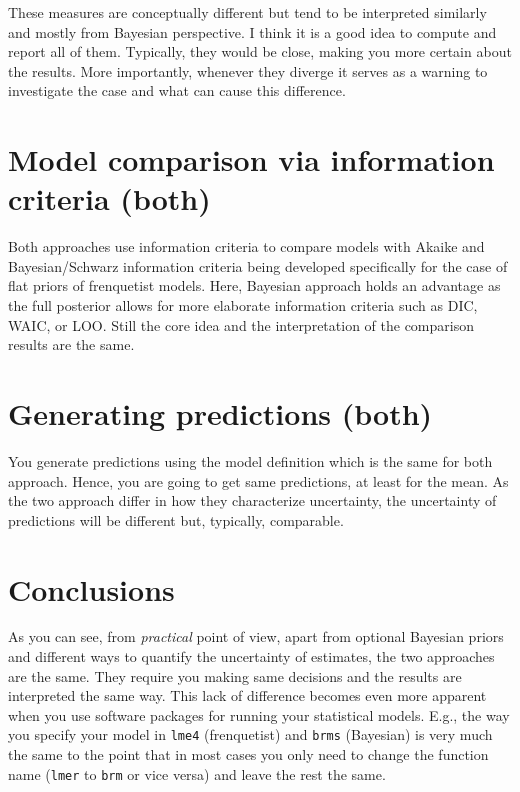\documentclass[
]{book}
\begin{document}
These measures are conceptually different but tend to be interpreted similarly and mostly from Bayesian perspective. I think it is a good idea to compute and report all of them. Typically, they would be close, making you more certain about the results. More importantly, whenever they diverge it serves as a warning to investigate the case and what can cause this difference.

\hypertarget{model-comparison-via-information-criteria-both}{%
\section{Model comparison via information criteria (both)}\label{model-comparison-via-information-criteria-both}}

Both approaches use information criteria to compare models with Akaike and Bayesian/Schwarz information criteria being developed specifically for the case of flat priors of frenquetist models. Here, Bayesian approach holds an advantage as the full posterior allows for more elaborate information criteria such as DIC, WAIC, or LOO. Still the core idea and the interpretation of the comparison results are the same.

\hypertarget{generating-predictions-both}{%
\section{Generating predictions (both)}\label{generating-predictions-both}}

You generate predictions using the model definition which is the same for both approach. Hence, you are going to get same predictions, at least for the mean. As the two approach differ in how they characterize uncertainty, the uncertainty of predictions will be different but, typically, comparable.

\hypertarget{conclusions}{%
\section{Conclusions}\label{conclusions}}

As you can see, from \emph{practical} point of view, apart from optional Bayesian priors and different ways to quantify the uncertainty of estimates, the two approaches are the same. They require you making same decisions and the results are interpreted the same way. This lack of difference becomes even more apparent when you use software packages for running your statistical models. E.g., the way you specify your model in \texttt{lme4} (frenquetist) and \texttt{brms} (Bayesian) is very much the same to the point that in most cases you only need to change the function name (\texttt{lmer} to \texttt{brm} or vice versa) and leave the rest the same.
\end{document}
